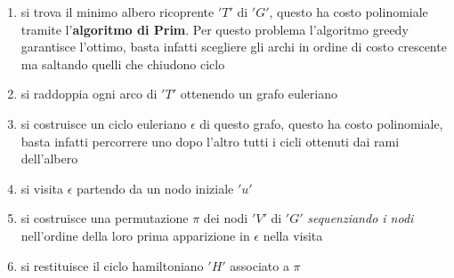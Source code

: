												      	\begin{enumerate}
												      		\item si trova il minimo albero ricoprente $ 'T' $ di $ 'G' $, questo ha costo
												      		      polinomiale tramite l'\textbf{algoritmo di Prim}. Per questo problema
												      		      l’algoritmo greedy garantisce l’ottimo, basta infatti scegliere gli archi in
												      		      ordine di costo crescente ma saltando quelli che chiudono ciclo
												      		\item si raddoppia ogni arco di $ 'T' $ ottenendo un grafo euleriano
												      		\item si costruisce un ciclo euleriano $\epsilon$ di questo grafo, questo ha
												      		      costo polinomiale, basta infatti percorrere uno dopo l’altro tutti i cicli
												      		      ottenuti dai rami dell’albero 
												      		\item si visita $\epsilon$ partendo da un nodo iniziale $ 'u' $
												      		\item si costruisce una permutazione $\pi$ dei nodi $ 'V' $ di $ 'G' $
												      		      \textit{sequenziando i nodi} nell’ordine della loro prima apparizione in
												      		      $\epsilon$ nella visita 
												      		\item si restituisce il ciclo hamiltoniano $ 'H' $ associato a $\pi$
												      	\end{enumerate}
                            
